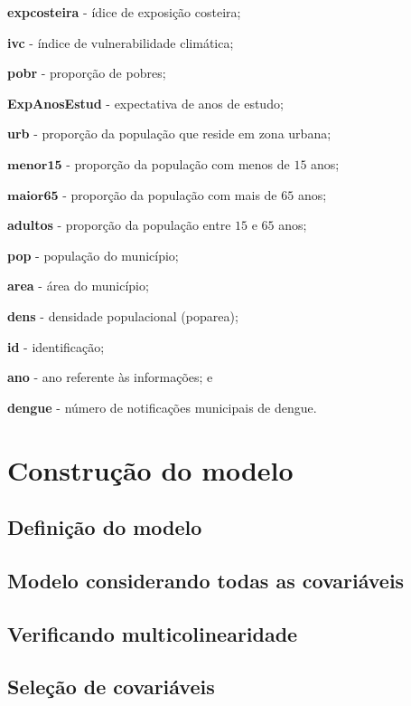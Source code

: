 \documentclass[12pt,a4paper]{article}\usepackage[]{graphicx}\usepackage[]{color}
\begin{document}
\noindent
\textbf{expcosteira} - ídice de exposição costeira;

\noindent
\textbf{ivc} - índice de vulnerabilidade climática;

\noindent
\textbf{pobr} - proporção de pobres;

\noindent
\textbf{ExpAnosEstud} - expectativa de anos de estudo;

\noindent
\textbf{urb} - proporção da população que reside em zona urbana;

\noindent
$\mathbf{menor15}$ - proporção da população com menos de $15$ anos;

\noindent
$\mathbf{maior65}$ - proporção da população com mais de $65$ anos;

\noindent
\textbf{adultos} - proporção da população entre $15$ e $65$ anos;

\noindent
\textbf{pop} - população do município;

\noindent
\textbf{area} - área do município;

\noindent
\textbf{dens} - densidade populacional (pop\/area);

\noindent
\textbf{id} - identificação;

\noindent
\textbf{ano} - ano referente às informações; e

\noindent
\textbf{dengue} - número de notificações municipais de dengue.

\newpage
\section{{\LARGE\textbf{Construção do modelo}}}

\subsection{\textbf{Definição do modelo}}

\subsection{\textbf{Modelo considerando todas as covariáveis}}

\subsection{\textbf{Verificando multicolinearidade}}




\subsection{\textbf{Seleção de covariáveis}}
\end{document}

